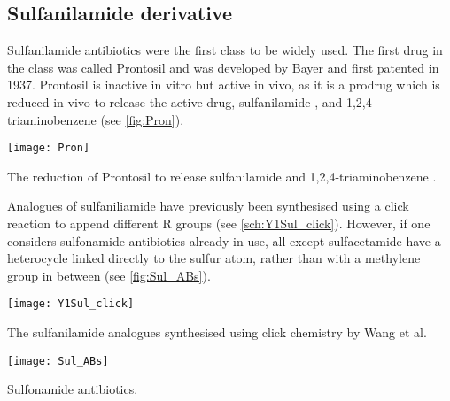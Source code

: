 \subsection{Sulfanilamide derivative}

Sulfanilamide antibiotics were the first class to be widely used\cite{Otten1986,Wainwright2011}. The first drug in the class was called Prontosil  and was developed by Bayer and first patented in 1937. Prontosil  is inactive in vitro but active in vivo, as it is a prodrug which is reduced in vivo to release the active drug, sulfanilamide , and 1,2,4-triaminobenzene  (see \ref{fig:Pron}).



\begin{scheme}[H]
	\begin{center}
		\texttt{[image: Pron]}
		\caption{The reduction of Prontosil  to release sulfanilamide  and 1,2,4-triaminobenzene .
		\label{fig:Pron}}
	\end{center}
\end{scheme}

Analogues of sulfaniliamide  have previously been synthesised using a click reaction to append different R groups\cite{Wang2010} (see \ref{sch:Y1Sul_click}). However, if one considers sulfonamide antibiotics already in use, all except sulfacetamide have a heterocycle linked directly to the sulfur atom, rather than with a methylene group in between (see \ref{fig:Sul_ABs}). 

\begin{scheme}[H]
	\begin{center}
		\texttt{[image: Y1Sul\_click]}
		\caption{The sulfanilamide analogues synthesised using click chemistry by Wang et al\cite{Wang2010}.
		\label{sch:Y1Sul_click}}
	\end{center}
\end{scheme}

\begin{scheme}[H]
	\begin{center}
		\texttt{[image: Sul\_ABs]}
		\caption{Sulfonamide antibiotics.
		\label{fig:Sul_ABs}}
	\end{center}
\end{scheme}

